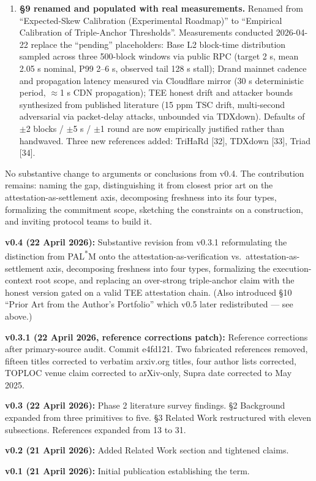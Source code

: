 \documentclass[11pt]{article}
\begin{document}
\begin{enumerate}
\item \textbf{\S9 renamed and populated with real measurements.} Renamed from ``Expected-Skew Calibration (Experimental Roadmap)'' to ``Empirical Calibration of Triple-Anchor Thresholds''. Measurements conducted 2026-04-22 replace the ``pending'' placeholders: Base L2 block-time distribution sampled across three 500-block windows via public RPC (target 2 s, mean 2.05 s nominal, P99 2--6 s, observed tail 128 s stall); Drand mainnet cadence and propagation latency measured via Cloudflare mirror (30 s deterministic period, $\approx$1 s CDN propagation); TEE honest drift and attacker bounds synthesized from published literature (15 ppm TSC drift, multi-second adversarial via packet-delay attacks, unbounded via TDXdown). Defaults of $\pm$2 blocks / $\pm$5 s / $\pm$1 round are now empirically justified rather than handwaved. Three new references added: TriHaRd [32], TDXdown [33], Triad [34].
\end{enumerate}

No substantive change to arguments or conclusions from v0.4. The contribution remains: naming the gap, distinguishing it from closest prior art on the attestation-as-settlement axis, decomposing freshness into its four types, formalizing the commitment scope, sketching the constraints on a construction, and inviting protocol teams to build it.

\textbf{v0.4 (22 April 2026):} Substantive revision from v0.3.1 reformulating the distinction from PAL\textsuperscript{*}M onto the attestation-as-verification vs.\ attestation-as-settlement axis, decomposing freshness into four types, formalizing the execution-context root scope, and replacing an over-strong triple-anchor claim with the honest version gated on a valid TEE attestation chain. (Also introduced \S10 ``Prior Art from the Author's Portfolio'' which v0.5 later redistributed --- see above.)

\textbf{v0.3.1 (22 April 2026, reference corrections patch):} Reference corrections after primary-source audit. Commit e4fd121. Two fabricated references removed, fifteen titles corrected to verbatim arxiv.org titles, four author lists corrected, TOPLOC venue claim corrected to arXiv-only, Supra date corrected to May 2025.

\textbf{v0.3 (22 April 2026):} Phase 2 literature survey findings. \S2 Background expanded from three primitives to five. \S3 Related Work restructured with eleven subsections. References expanded from 13 to 31.

\textbf{v0.2 (21 April 2026):} Added Related Work section and tightened claims.

\textbf{v0.1 (21 April 2026):} Initial publication establishing the term.
\end{document}
